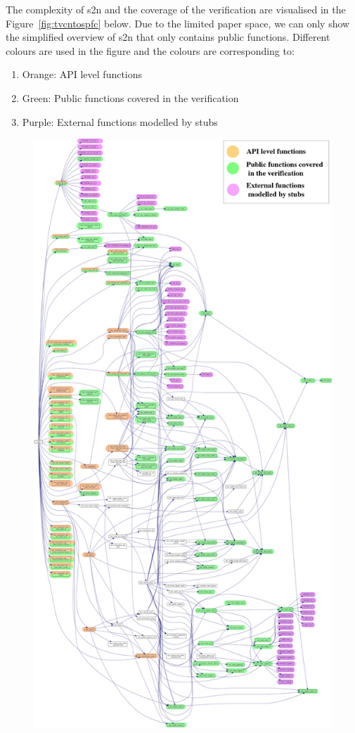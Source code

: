 

The complexity of s2n and the coverage of the verification are visualised in the Figure~\ref{fig:tvcntospfc} below. Due to the limited paper space, we can only show the simplified overview of s2n that only contains public functions. Different colours are used in the figure and the colours are corresponding to:
\begin{enumerate}[nolistsep]
    \item Orange: API level functions
    \item Green: Public functions covered in the verification
    \item Purple: External functions modelled by stubs
\end{enumerate}

\begin{figure}[tp]
    \centering
    \includegraphics[height=0.95\textheight,keepaspectratio]{./contents/images/call-graph-color.png}

\end{figure}
